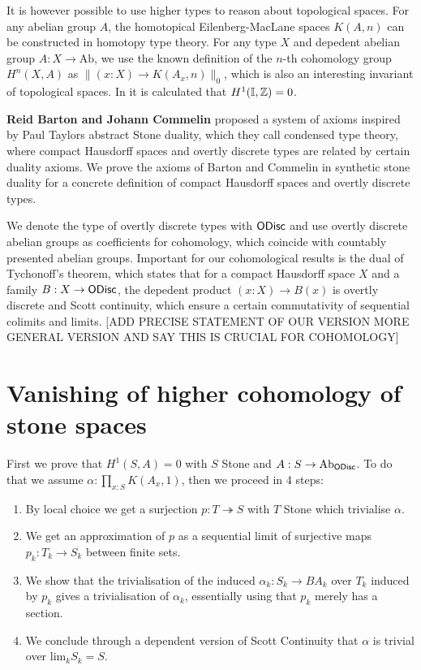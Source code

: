 \documentclass{../util/zariski}
\begin{document}
It is however possible to use higher types to reason about topological spaces.
For any abelian group $A$, the homotopical Eilenberg-MacLane spaces $K(A,n)$ can be constructed in homotopy type theory. For any type $X$ and depedent abelian group $A:X\to \mathrm{Ab}$, we use the known definition of the $n$-th cohomology group $H^n(X,A)$ as $\|(x:X)\to K(A_x,n)\|_0$, which is also an interesting invariant of topological spaces. In \cite{synthetic-stone-duality} it is calculated that $H^1(\mathbb{I},\mathbb{Z})=0$.

\textbf{Reid Barton and Johann Commelin} proposed a system of axioms inspired by Paul Taylors abstract Stone duality, which they call condensed type theory, where compact Hausdorff spaces and overtly discrete types are related by certain duality axioms. We prove the axioms of Barton and Commelin in synthetic stone duality for a concrete definition of compact Hausdorff spaces and overtly discrete types.

We denote the type of overtly discrete types with $\mathsf{ODisc}$ and use overtly discrete abelian groups as coefficients for cohomology, which coincide with countably presented abelian groups.
Important for our cohomological results is the dual of Tychonoff's theorem, which states that for a compact Hausdorff space $X$ and a family $B:X\to \mathsf{ODisc}$, the depedent product $(x:X)\to B(x)$ is overtly discrete and Scott continuity, which ensure a certain commutativity of sequential colimits and limits. [ADD PRECISE STATEMENT OF OUR VERSION MORE GENERAL VERSION AND SAY THIS IS CRUCIAL FOR COHOMOLOGY]

\section{Vanishing of higher cohomology of stone spaces}

First we prove that $H^1(S,A) = 0$ with $S$ Stone and  $A : S\to \mathrm{Ab}_{\mathsf{ODisc}}$. To do that we assume $\alpha:\prod_{x:S}K(A_x,1)$, then we proceed in 4 steps:
\begin{enumerate}[(1)]
\item By local choice we get a surjection $p:T\twoheadrightarrow S$ with $T$ Stone which trivialise $\alpha$.
\item We get an approximation of $p$ as a sequential limit of surjective maps $p_k:T_k\to S_k$ between finite sets.
\item We show that the trivialisation of the induced $\alpha_k:S_k\to BA_k$ over $T_k$ induced by $p_k$ gives a trivialisation of $\alpha_k$, essentially using that $p_k$ merely has a section.
\item We conclude through a dependent version of Scott Continuity that $\alpha$ is trivial over $\mathrm{lim}_kS_k =S$.
\end{enumerate}
\end{document}
